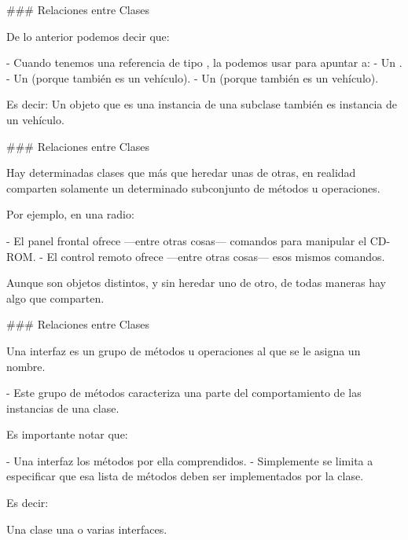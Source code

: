 ### Relaciones entre Clases


De lo anterior podemos decir que:

- Cuando tenemos una referencia de tipo , la podemos usar para apuntar a:
    - Un .
    - Un  (porque también es un vehículo).
    - Un  (porque también es un vehículo).

Es decir:
\vspace{-2em}
\importantboxbegin{}
Un objeto que es una instancia de una subclase también es instancia de un vehículo.
\importantboxend


### Relaciones entre Clases


Hay determinadas clases que más que heredar unas de otras, en realidad comparten
solamente un determinado subconjunto de métodos u operaciones.\newline

Por ejemplo, en una radio:

- El panel frontal ofrece ---entre otras cosas--- comandos para manipular el CD-ROM.
- El control remoto ofrece ---entre otras cosas--- esos mismos comandos.

Aunque son objetos distintos, y sin heredar uno de otro, de todas maneras hay algo que comparten.

### Relaciones entre Clases


Una interfaz es un grupo de métodos u operaciones al que se le asigna un nombre.

- Este grupo de métodos caracteriza una parte del comportamiento de las instancias de una clase.

Es importante notar que:

- Una interfaz  los métodos por ella comprendidos.
- Simplemente se limita a especificar que esa lista de métodos deben ser implementados
por la clase.

Es decir:
\vspace{-1em}
\begin{center}\hspace{60mm}\begin{customRoundedBox}{}
\centering Una clase  una o varias interfaces.
\end{customRoundedBox}\end{center}


